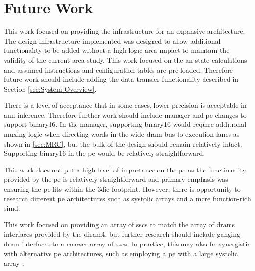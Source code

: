 \section[Future Work]{Future Work}
\label{sec:Future Work}

This work focused on providing the infrastructure for an expansive architecture.
The design infrastructure implemented was designed to allow additional functionality to be added without a high logic area impact to maintain the validity of the current area study.
This work focused on the \ac{an} state calculations and assumed instructions and configuration tables are pre-loaded.
Therefore future work should include adding the data transfer functionality described in Section \ref{sec:System Overview}.

There is a level of acceptance that in some cases, lower precision is acceptable in \ac{ann} inference. Therefore further work should include manager and \ac{pe} changes to support \ac{binary16}.
In the manager, supporting \ac{binary16} would require additional muxing logic when directing words in the wide \ac{dram} bus to execution lanes as shown in \ref{sec:MRC}, but the bulk of the design should remain relatively intact.
Supporting \ac{binary16} in the \ac{pe} would be relatively straightforward.

This work does not put a high level of importance on the \ac{pe} as the functionality provided by the \ac{pe} is relatively straightforward and primary emphasis was ensuring the \ac{pe} fits within the \ac{3dic} footprint.
However, there is opportunity to research different \ac{pe} architectures such as systolic arrays and a more function-rich \ac{simd}.

This work focused on providing an array of \acp{ssc} to match the array of \acp{dram} interfaces provided by the \ac{diram4}, but further research should include ganging \ac{dram} interfaces to a coarser array of \acp{ssc}.
In practice, this may also be synergistic with alternative \ac{pe} architectures, such as employing a \ac{pe} with a large systolic array \cite{jouppi2017datacenter}.

